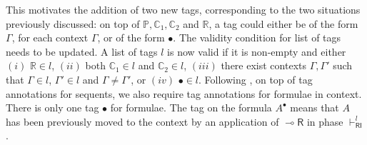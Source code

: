 \documentclass[submission,copyright,creativecommons]{eptcs}
\theoremstyle{definition}
\newtheorem{defn}{Definition}[section]
\newcommand{\lright}{{\multimap}\mathsf{R}}
\newcommand{\lleft}{{\multimap}\mathsf{L}}
\newcommand{\RI}{\mathsf{RI}}
\newcommand{\tP}{\mathbb{P}}
\newcommand{\tCone}{\mathbb{C}_1}
\newcommand{\tCtwo}{\mathbb{C}_2}
\newcommand{\tE}{\mathbb{R}}
\newcommand{\SkNMILLA}{$\mathtt{SkNMILLA}$}
\begin{document}


This motivates the addition of two new tags, corresponding to the two situations previously discussed: on top of $\tP,\tCone,\tCtwo$ and $\tE$, a tag could either be of the form $\Gamma$, for each context $\Gamma$, or of the form $\bullet$.  The validity condition for list of tags needs to be updated. A list of tags $l$ is now valid if it is non-empty and either $(i)$ $\tE \in l$, $(ii)$ both $\tCone \in l$ and $\tCtwo \in l$,  $(iii)$ there exist contexts $\Gamma , \Gamma'$ such that $ \Gamma \in l$, $ \Gamma' \in l$ and $ \Gamma \neq  \Gamma'$, or $(iv)$ $\bullet \in l$. Following \cite{UVW:protsn}, on top of tag annotations for sequents, we also require tag annotations for formulae in context. There is only one tag $\bullet$ for formulae. The tag on the formula $A^\bullet$ means that $A$ has been previously moved to the context by an application of $\lright$ in phase $\vdash^l_\RI$.
\end{document}
